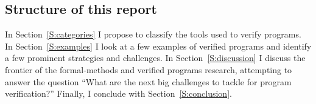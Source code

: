 \subsection{Structure of this report}

In Section~\ref{S:categories} I propose to classify the tools used to verify
programs. In Section~\ref{S:examples} I look at a few examples of verified
programs and identify a few prominent strategies and challenges. In
Section~\ref{S:discussion} I discuss the frontier of the formal-methods and
verified programs research, attempting to answer the question ``What are the
next big challenges to tackle for program verification?'' Finally, I conclude
with Section~\ref{S:conclusion}.

